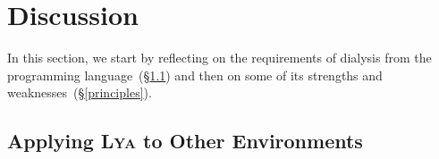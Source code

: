 \documentclass[letterpaper,twocolumn,10pt]{article}
\newcommand{\ttiny}[1]{\texttt{\footnotesize #1}}
\newcommand{\sx}[1]{(\S\ref{#1})}
\newcommand{\sys}{{\scshape Lya}\xspace}
\begin{document}
\section{Discussion}
\label{diss}

In this section, we start by reflecting on the requirements of dialysis from the programming language~\sx{reqs} and then on some of its strengths and weaknesses~\sx{principles}.

\subsection{Applying \sys to Other Environments}
\label{reqs}

\end{document}
